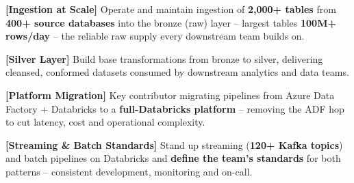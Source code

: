 
\vspace{1pt}
\begin{resume_list}
  \item \textbf{[Ingestion at Scale]} Operate and maintain ingestion of \textbf{2{,}000+ tables} from \textbf{400+ source databases} into the bronze (raw) layer -- largest tables \textbf{100M+ rows/day} -- the reliable raw supply every downstream team builds on.
  \item \textbf{[Silver Layer]} Build base transformations from bronze to silver, delivering cleansed, conformed datasets consumed by downstream analytics and data teams.
  \item \textbf{[Platform Migration]} Key contributor migrating pipelines from Azure Data Factory + Databricks to a \textbf{full-Databricks platform} -- removing the ADF hop to cut latency, cost and operational complexity.
  \item \textbf{[Streaming \& Batch Standards]} Stand up streaming (\textbf{120+ Kafka topics}) and batch pipelines on Databricks and \textbf{define the team's standards} for both patterns -- consistent development, monitoring and on-call.
\end{resume_list}
